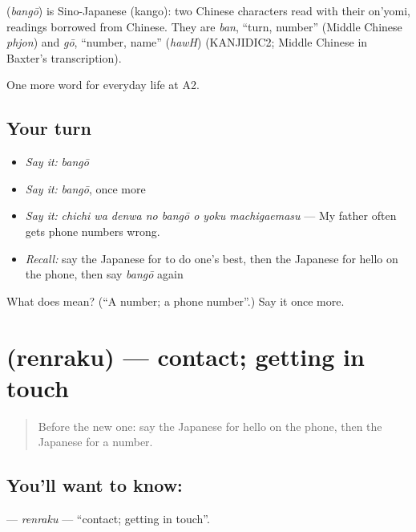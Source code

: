 \begin{cousinweb}
\textbf{} (\emph{bangō}) is Sino-Japanese (kango): two Chinese characters read with their on'yomi, readings borrowed from Chinese. They are \emph{ban}, \textquotedblleft{}turn, number\textquotedblright{} (Middle Chinese \emph{phjon}) and \emph{gō}, \textquotedblleft{}number, name\textquotedblright{} (\emph{hawH}) (KANJIDIC2; Middle Chinese in Baxter's transcription).
\end{cousinweb}

\begin{grammarlens}[title={What you've built}]
One more word for everyday life at A2.
\end{grammarlens}

\subsection*{Your turn}
\begin{itemize}
\raggedright
  \item \emph{Say it:} \emph{bangō}
  \item \emph{Say it:} \emph{bangō}, once more
  \item \emph{Say it:} \emph{chichi wa denwa no bangō o yoku machigaemasu} — My father often gets phone numbers wrong.
  \item \emph{Recall:} say the Japanese for to do one's best, then the Japanese for hello on the phone, then say \emph{bangō} again
\end{itemize}

\begin{tcolorbox}[breakable,colback=teal!4,colframe=teal!35!black,title={Before you move on}]
What does  mean? (\textquotedblleft{}A number; a phone number\textquotedblright{}.) Say it once more.
\end{tcolorbox}
\section[\texorpdfstring{\ja{れんらく} (renraku)}{れんらく (renraku)}]{ (renraku) — contact; getting in touch}

\label{lesson:JA-C231-renraku}



\begin{quote}
Before the new one: say the Japanese for hello on the phone, then the Japanese for a number.
\end{quote}

\subsection*{You'll want to know: }
\textbf{} — \emph{renraku} — \textquotedblleft{}contact; getting in touch\textquotedblright{}.

